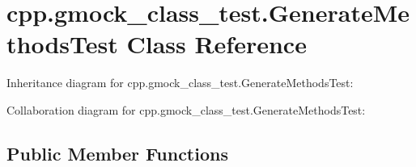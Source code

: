 \hypertarget{classcpp_1_1gmock__class__test_1_1GenerateMethodsTest}{}\section{cpp.\+gmock\+\_\+class\+\_\+test.\+Generate\+Methods\+Test Class Reference}
\label{classcpp_1_1gmock__class__test_1_1GenerateMethodsTest}


Inheritance diagram for cpp.\+gmock\+\_\+class\+\_\+test.\+Generate\+Methods\+Test\+:


Collaboration diagram for cpp.\+gmock\+\_\+class\+\_\+test.\+Generate\+Methods\+Test\+:
\subsection*{Public Member Functions}
